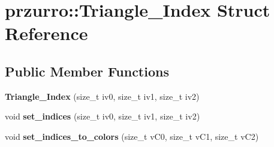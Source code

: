 \hypertarget{structprzurro_1_1_triangle___index}{}\section{przurro\+::Triangle\+\_\+\+Index Struct Reference}
\label{structprzurro_1_1_triangle___index}
\subsection*{Public Member Functions}
\begin{DoxyCompactItemize}
\item 
\mbox{\label{structprzurro_1_1_triangle___index_ad1fc2abe1591d03411947c0ba2e2b99b}} 
{\bfseries Triangle\+\_\+\+Index} (size\+\_\+t iv0, size\+\_\+t iv1, size\+\_\+t iv2)
\item 
\mbox{\label{structprzurro_1_1_triangle___index_ab516be1a74da950865122d129b50859b}} 
void {\bfseries set\+\_\+indices} (size\+\_\+t iv0, size\+\_\+t iv1, size\+\_\+t iv2)
\item 
\mbox{\label{structprzurro_1_1_triangle___index_ac37166ecd84c1b426aca765d998afc17}} 
void {\bfseries set\+\_\+indices\+\_\+to\+\_\+colors} (size\+\_\+t v\+C0, size\+\_\+t v\+C1, size\+\_\+t v\+C2)
\end{DoxyCompactItemize}
